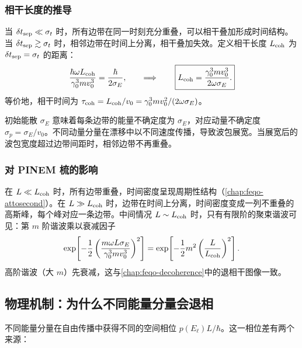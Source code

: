 \subsubsection{相干长度的推导}

当 $\delta t_{\rm sep}\ll\sigma_t$ 时，所有边带在同一时刻充分重叠，可以相干叠加形成时间结构。当 $\delta t_{\rm sep}\gtrsim\sigma_t$ 时，相邻边带在时间上分离，相干叠加失效。定义相干长度 $L_{\rm coh}$ 为 $\delta t_{\rm sep}=\sigma_t$ 的距离：
\begin{equation}
\frac{\hbar\omega L_{\rm coh}}{\gamma_0^3mv_0^3}=\frac{\hbar}{2\sigma_E},
\qquad\Longrightarrow\qquad
\boxed{L_{\rm coh}=\frac{\gamma_0^3mv_0^3}{2\omega\sigma_E}.}
\label{eq:feqo-coherence-length}
\end{equation}
等价地，相干时间为 $\tau_{\rm coh}=L_{\rm coh}/v_0=\gamma_0^3mv_0^2/(2\omega\sigma_E)$。

\begin{note}[另一种理解]
初始能散 $\sigma_E$ 意味着每条边带的能量不确定度为 $\sigma_E$，对应动量不确定度 $\sigma_p=\sigma_E/v_0$。不同动量分量在漂移中以不同速度传播，导致波包展宽。当展宽后的波包宽度超过边带间距时，相邻边带不再重叠。

\subsubsection{对 PINEM 梳的影响}

在 $L\ll L_{\rm coh}$ 时，所有边带重叠，时间密度呈现周期性结构（\cref{chap:feqo-attosecond}）。在 $L\gg L_{\rm coh}$ 时，边带在时间上分离，时间密度变成一列不重叠的高斯峰，每个峰对应一条边带。中间情况 $L\sim L_{\rm coh}$ 时，只有有限阶的聚束谐波可见：第 $m$ 阶谐波乘以衰减因子
\begin{equation}
\exp\!\left[-\frac{1}{2}\left(\frac{m\omega L\sigma_E}{\gamma_0^3mv_0^3}\right)^2\right]
=\exp\!\left[-\frac{1}{2}m^2\left(\frac{L}{L_{\rm coh}}\right)^2\right].
\label{eq:feqo-energy-spread-damping}
\end{equation}
高阶谐波（大 $m$）先衰减，这与\cref{chap:feqo-decoherence}中的退相干图像一致。

\end{note}

\subsection{物理机制：为什么不同能量分量会退相}

不同能量分量在自由传播中获得不同的空间相位 $p(E_\ell)L/\hbar$。这一相位差有两个来源：

